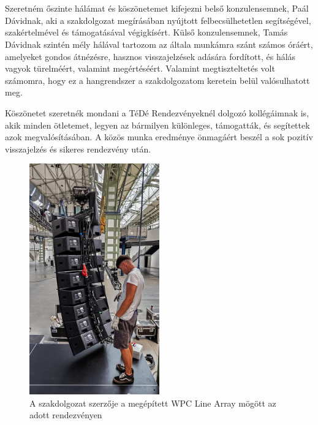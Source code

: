 \chapter*{\koszonetnyilvanitas}

Szeretném őszinte hálámat és köszönetemet kifejezni belső konzulensemnek, Paál Dávidnak, aki a szakdolgozat
megírásában nyújtott felbecsülhetetlen segítségével, szakértelmével és támogatásával végigkísért.
Külső konzulensemnek, Tamás Dávidnak szintén mély hálával tartozom az általa munkámra szánt számos óráért, 
amelyeket gondos átnézésre, hasznos visszajelzések adására fordított, és hálás vagyok türelméért, valamint megértéséért. Valamint
megtiszteltetés volt számomra, hogy ez a hangrendszer a szakdolgozatom keretein belül valósulhatott meg.

Köszönetet szeretnék mondani a TéDé Rendezvényeknél dolgozó kollégáimnak is, akik minden ötletemet, 
legyen az bármilyen különleges, támogatták, és segítettek azok megvalósításában. A közös munka eredménye önmagáért beszél
a sok pozitív visszajelzés és sikeres rendezvény után.

\begin {figure}[h!]
    \centering
    \includegraphics[width=0.5\textwidth]{figures/danci_wpc.jpg}
    \caption{A szakdolgozat szerzője a megépített WPC Line Array mögött az adott rendezvényen}
\end {figure}


